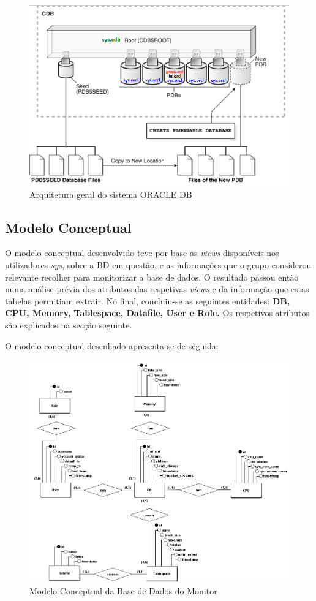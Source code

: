 \documentclass[a4paper]{article}
\begin{document}
\begin{figure}[H]
\centering
\includegraphics[scale=0.75]{arquitetura.png}
\caption{Arquitetura geral do sistema ORACLE DB}
\end{figure}

\subsection{Modelo Conceptual}
\hspace{3mm} 
O modelo conceptual desenvolvido teve por base as \emph{views} disponíveis nos utilizadores \emph{sys}, sobre a BD em questão, e as informações que o grupo considerou relevante recolher para monitorizar a base de dados. O resultado passou então numa análise prévia dos atributos das respetivas \emph{views} e da informação que estas tabelas permitiam extrair. No final, concluiu-se as seguintes entidades:
\textbf{DB, CPU, Memory, Tablespace, Datafile, User e Role.} Os respetivos atributos são explicados na secção seguinte.

O modelo conceptual desenhado apresenta-se de seguida:

\begin{figure}[H]
\centering
\includegraphics[scale=0.45]{modelo_conceptual.png}
\caption{Modelo Conceptual da Base de Dados do Monitor}
\end{figure}
\end{document}
